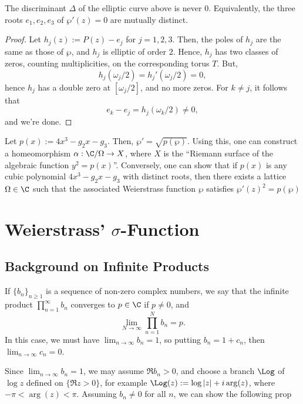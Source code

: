 \documentclass[11pt]{report}
\begin{document}
\begin{prop}
    The discriminant $\Delta$ of the elliptic curve above is never $0$. Equivalently, the three roots $e_1,e_2,e_3$ of $\wp'(z)=0$ are mutually distinct.
\end{prop}

\begin{proof}
    Let $h_j(z) := P(z)-e_j$ for $j=1,2,3$. Then, the poles of $h_j$ are the same as those of $\wp$, and $h_j$ is elliptic of order $2$. Hence, $h_j$ has two classes of zeros, counting multiplicities, on the corresponding torus $T$. But,
    $$h_j(\omega_j/2) = h_j'(\omega_j/2)=0,$$
    hence $h_j$ has a double zero at $[\omega_j/2]$, and no more zeros. For $k \neq j$, it follows that
    $$e_k  -e_j= h_j(\omega_k/2) \neq 0,$$
    and we're done.
\end{proof}

\begin{rmk}
    Let $p(x):= 4x^3 -g_2x-g_3$. Then, $\wp' = \sqrt{p(\wp)}$. Using this, one can construct a homeomorphism $\alpha: \C /\Omega \to X$, where $X$ is the ``Riemann surface of the algebraic function $y^2 = p(x)$''. Conversely, one can show that if $p(x)$ is any cubic polynomial $4x^3-g_2x-g_3$ with distinct roots, then there exists a lattice $\Omega \in \C$ such that the associated Weierstrass function $\wp$ satisfies $\wp'(z)^2 = p(\wp)$
\end{rmk}

\section{\texorpdfstring{Weierstrass' $\sigma$-Function}{Weierstrass' Sigma Function}}

\subsection{Background on Infinite Products}

If $\{b_n\}_{n \geq 1}$ is a sequence of non-zero complex numbers, we say that the infinite product $\prod_{n=1}^\infty b_n$ converges to $p \in \C$ if $p \neq 0$, and
$$\lim_{N \to \infty}\prod_{n=1}^Nb_n=p.$$
In this case, we must have $\lim_{n \to \infty}b_n =1$, so putting $b_n = 1+c_n$, then $\lim_{n \to \infty}c_n =0$.

Since $\lim_{n \to \infty}b_n=1$, we may assume $\Re b_n>0$, and choose a branch $\Log$ of $\log z$ defined on $\{\Re z>0\}$, for example $\Log(z) := \log|z| + i\arg (z)$, where $-\pi < \arg(z) < \pi$. Assuming $b_n \neq 0$ for all $n$, we can show the following prop
\end{document}
